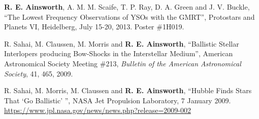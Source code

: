 \begin{cvpubs}
  \cvpub
    {
      \begin{cvetar}
        \item {\textbf{R. E. Ainsworth}, A. M. M. Scaife, T. P. Ray, D. A. Green and J. V. Buckle, ``The Lowest Frequency Observations of YSOs with the GMRT'', Protostars and Planets VI, Heidelberg, July 15-20, 2013. Poster \#1H019.}
        \item {R. Sahai, M. Claussen, M. Morris and \textbf{R. E. Ainsworth}, ``Ballistic Stellar Interlopers producing Bow-Shocks in the Interstellar Medium'', American Astronomical Society Meeting \#213, \textit{Bulletin of the American Astronomical Society}, 41, 465, 2009.}
      \end{cvetar}
    }
\end{cvpubs}

\begin{cvpubs}
  \cvpub
    {
      \begin{cvetar}
        \item {R. Sahai, M. Morris, M. Claussen and \textbf{R. E. Ainsworth}, ``Hubble Finds Stars That `Go Ballistic' '', NASA Jet Propulsion Laboratory, 7 January 2009. \url{https://www.jpl.nasa.gov/news/news.php?release=2009-002}}
      \end{cvetar}
    }
\end{cvpubs}


